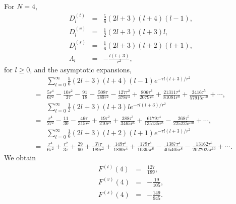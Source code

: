 \documentclass[a4paper,aps,preprint,groupedaddress,showpacs]{revtex4}
\begin{document}
For $N=4$,
\begin{eqnarray}
D^{(t)}_{l}&=&\frac{5}{6}(2l+3)(l+4)(l-1),
\\
D^{(v)}_{l}&=&\frac{1}{2}(2l+3)(l+3)l,
\\
D^{(s)}_{l}&=&\frac{1}{6}(2l+3)(l+2)(l+1),
\\
\Lambda_{l}&=&-\frac{l(l+3)}{r^{2}},
\end{eqnarray}
for $l\geq 0$, and the asymptotic expansions,
\begin{eqnarray}
&&\sum^{\infty}_{l=0}\frac{5}{6}(2l+3)(l+4)(l-1)
e^{-\tau l(l+3)/r^{2}}
\nonumber\\
&=&\frac{5r^{4}}{6\tau^{2}}-\frac{10r^{2}}{3\tau}-
\frac{91}{18}-\frac{508\tau}{189r^{2}}-
\frac{127\tau^{2}}{378r^{4}}+\frac{806\tau^{3}}{2079r^{6}}+
\frac{21311\tau^{4}}{81081r^{8}}+
\frac{3416\tau^{5}}{57915r^{10}}+\cdots,
\\
&&\sum^{\infty}_{l=0}\frac{1}{2}(2l+3)(l+3)l
e^{-\tau l(l+3)/r^{2}}
\nonumber\\
&=&\frac{r^{4}}{2\tau^{2}}-\frac{11}{30}-
\frac{46\tau}{315r^{2}}+\frac{19\tau^{2}}{210r^{4}}+
\frac{388\tau^{3}}{3465r^{6}}+
\frac{6179\tau^{4}}{135135r^{8}}-
\frac{268\tau^{5}}{225225r^{10}}+\cdots,
\\
&&\sum^{\infty}_{l=0}\frac{1}{6}(2l+3)(l+2)(l+1)
e^{-\tau l(l+3)/r^{2}}
\nonumber\\
&=&\frac{r^{4}}{6\tau^{2}}+\frac{r^{2}}{3\tau}+
\frac{29}{90}+\frac{37\tau}{189r^{2}}+
\frac{149\tau^{2}}{1890r^{4}}+
\frac{179\tau^{3}}{10395r^{6}}-
\frac{1387\tau^{4}}{405405r^{8}}-
\frac{13162\tau^{5}}{2027025r^{10}}+\cdots.
\end{eqnarray}
We obtain
\begin{eqnarray}
F^{(t)}(4)&=&\frac{127}{189},
\\
F^{(v)}(4)&=&-\frac{19}{105},
\\
F^{(s)}(4)&=&-\frac{149}{945}.
\end{eqnarray}
\end{document}
